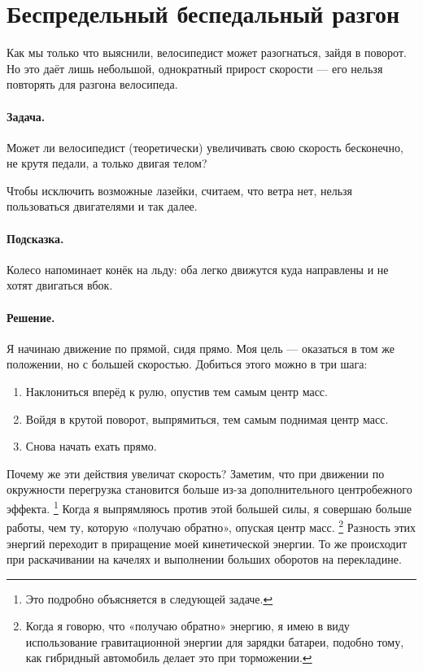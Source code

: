 \section{Беспредельный беспедальный разгон}\label{Как разогнаться на велосипеде, двигая только тело?}

Как мы только что выяснили, велосипедист может разогнаться, зайдя в поворот.
Но это даёт лишь небольшой, однократный прирост скорости --- его нельзя повторять для разгона велосипеда.

\paragraph{Задача.}
Может ли велосипедист (теоретически) увеличивать свою скорость бесконечно, не крутя педали, а только двигая телом?

Чтобы исключить возможные лазейки, считаем, что ветра нет, нельзя пользоваться двигателями и так далее.

\paragraph{Подсказка.}
Колесо напоминает конёк на льду: оба легко движутся куда направлены и не хотят двигаться вбок.

\paragraph{Решение.}
Я начинаю движение по прямой, сидя прямо.
Моя цель --- оказаться в том же положении, но с большей скоростью.
Добиться этого можно в три шага:
\begin{enumerate}
\item Наклониться вперёд к рулю, опустив тем самым центр масс.
\item Войдя в крутой поворот, выпрямиться, тем самым поднимая центр масс.
\item Снова начать ехать прямо.
\end{enumerate}

Почему же эти действия увеличат скорость?
Заметим, что при движении по окружности перегрузка становится больше из-за дополнительного центробежного эффекта.%
\footnote{Это подробно объясняется в следующей задаче.}
Когда я выпрямляюсь против этой большей силы, я совершаю больше работы, чем ту, которую «получаю обратно», опуская центр масс.%
\footnote{Когда я говорю, что «получаю обратно» энергию, я имею в виду использование гравитационной энергии для зарядки батареи, подобно тому, как гибридный автомобиль делает это при торможении.}
Разность этих энергий переходит в приращение моей кинетической энергии.
То же происходит при раскачивании на качелях и выполнении больших оборотов на перекладине.

